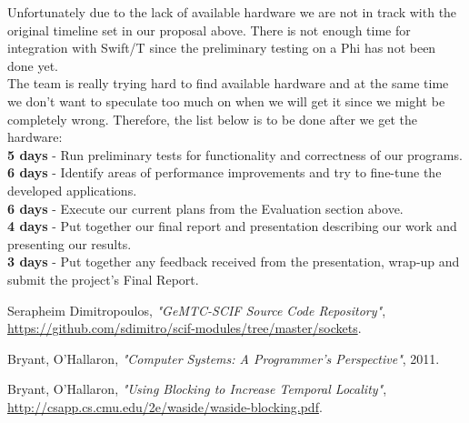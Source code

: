 \documentclass[10pt, conference, compsocconf]{IEEEtran}
\begin{document}
Unfortunately due to the lack of available hardware we are not
in track with the original timeline set in our proposal above.
There is not enough time for integration with Swift/T since
the preliminary testing on a Phi has not been done yet.\\

The team is really trying hard to find available hardware
and at the same time we don't want to speculate too much
on when we will get it since we might be completely wrong.
Therefore, the list below is to be done after we get the
hardware:\\

\textbf{5 days} - Run preliminary tests for functionality
and correctness of our programs.\\

\textbf{6 days} - Identify areas of performance improvements
and try to fine-tune the developed applications.\\

\textbf{6 days} - Execute our current plans from the Evaluation
section above.\\

\textbf{4 days} - Put together our final report and presentation
describing our work and presenting our results.\\

\textbf{3 days} - Put together any feedback received from the
presentation, wrap-up and submit the project’s Final Report.\\

\begin{thebibliography}{2}

Serapheim Dimitropoulos, \emph{"GeMTC-SCIF Source Code Repository"},
\url{https://github.com/sdimitro/scif-modules/tree/master/sockets}.

Bryant, O'Hallaron,
\emph{"Computer Systems: A Programmer's Perspective"}, 2011.

Bryant, O'Hallaron,
\emph{"Using Blocking to Increase Temporal Locality"},
\url{http://csapp.cs.cmu.edu/2e/waside/waside-blocking.pdf}.

\end{thebibliography}

\end{document}
